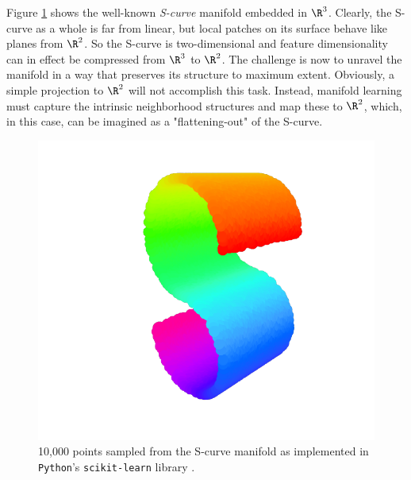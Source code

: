 \begin{minipage}[b]{0.5\textwidth}
  Figure \ref{fig:scurve} shows the well-known \textit{S-curve} manifold embedded 
  in $\R^3$.
  Clearly, the S-curve as a whole is far from linear, but local patches on its
  surface behave like planes from $\R^2$.
  So the S-curve is two-dimensional and feature dimensionality can in effect be 
  compressed from $\R^3$ to $\R^2$.
  The challenge is now to unravel the manifold in a way that preserves its 
  structure to maximum extent.
  Obviously, a simple projection to $\R^2$ will not accomplish this task.
  Instead, manifold learning must capture the intrinsic neighborhood structures
  and map these to $\R^2$, which, in this case, can be imagined as a 
  "flattening-out" of the S-curve.
\end{minipage}
\begin{minipage}[b]{0.1\textwidth}
  \phantom{space}
\end{minipage}
\begin{minipage}[b]{0.4\textwidth}
  \begin{figure}[H]
    \centering
    \includegraphics[trim = 100 20 100 20, clip, 
      width = \textwidth]{figures/s-curve}
    \caption[S-curve manifold]{10,000 points sampled from the S-curve manifold 
    as implemented in \texttt{Python}'s \texttt{scikit-learn} library 
    \citep{scikit-learn}.}
    \label{fig:scurve}
  \end{figure}
\end{minipage}

